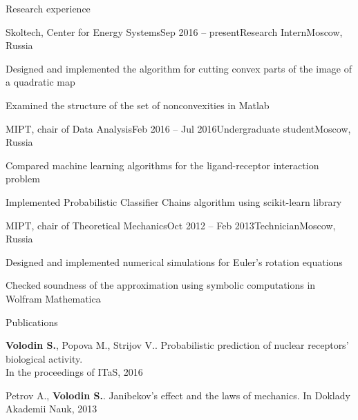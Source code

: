 \documentclass{resume} %
\begin{document}
\begin{rSection}{Research experience}
	\begin{rSubsection}{Skoltech, Center for Energy Systems}{Sep 2016 -- present}{Research Intern}{Moscow, Russia}
		\item Designed and implemented the algorithm for cutting convex parts of the image of a quadratic map
		\item Examined the structure of the set of nonconvexities in Matlab
	\end{rSubsection}
	
	\begin{rSubsection}{MIPT, chair of Data Analysis}{Feb 2016 -- Jul 2016}{Undergraduate student}{Moscow, Russia}
		\item Compared machine learning algorithms for the ligand-receptor interaction problem
		\item Implemented Probabilistic Classifier Chains algorithm using scikit-learn library
	\end{rSubsection}
	
	\begin{rSubsection}{MIPT, chair of Theoretical Mechanics}{Oct 2012 -- Feb 2013}{Technician}{Moscow, Russia}
		\item Designed and implemented numerical simulations for Euler's rotation equations
		\item Checked soundness of the approximation using symbolic computations in Wolfram Mathematica
	\end{rSubsection}
\end{rSection}

\begin{rSection}{Publications}
\item {\bf Volodin S.}, Popova M., Strijov V.. Probabilistic prediction of nuclear receptors’ biological activity.\\ In the proceedings of ITaS, 2016
\item Petrov A., {\bf Volodin S.}. Janibekov’s effect and the laws of mechanics. In Doklady Akademii Nauk, 2013
\end{rSection}
\end{document}
